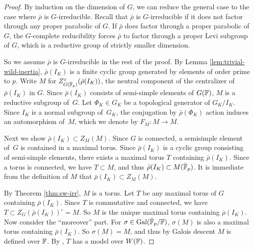 \documentclass[10pt,a4paper,twoside]{article}
\begin{document}
\begin{proof}
By induction on the dimension of $G$,
we can reduce the general case to the case where $\bar\rho$ is $G$-irreducible.
Recall that $\bar\rho$ is $G$-irreducible if it does not factor through any proper parabolic of $G$.
If $\bar\rho$ does factor through a proper parabolic of $G$, the $G$-complete reducibility forces
$\bar\rho$ to factor through a proper Levi subgroup of $G$, which is a reductive group
of strictly smaller dimension.

So we assume $\bar\rho$ is $G$-irreducible in the rest of the proof.
By Lemma \ref{lem:trivial-wild-inertia}, $\bar \rho(I_K)$ is a finite cyclic group
generated by elements of order prime to $p$.
Write $M$ for $Z^{\circ}_{G(\bar{\mathbb{F}}_p)}(\bar \rho(I_K))$,
the neutral component of the centralizer of $\bar \rho(I_K)$ in $G$.
Since $\bar\rho(I_K)$ consists of semi-simple elements of $G({\mathbb{F}})$,
$M$ is a reductive subgroup of~$G$.
Let $\Phi_K \in G_K$ be a topological generator of $G_K/I_K$.
Since $I_K$ is a normal subgroup of~$G_K$,
the conjugation by $\bar\rho(\Phi_K)$ action induces an automorphism of~$M$,
which we denote by $F_M: M \to M$.

Next we show $\bar\rho(I_K)\subset Z_M(M)$.
Since $G$ is connected, a semisimple element of~$G$ is contained in a maximal torus.
Since $\bar\rho(I_K)$ is a cyclic group consisting of semi-simple elements,
there exists a maximal torus $T$ containing $\bar\rho(I_K)$.
Since a torus is connected, we have $T\subset M$, and thus $\bar\rho(I_K)\subset M(\bar{\mathbb{F}}_p)$.
It is immediate from the definition of $M$ that $\bar\rho(I_K) \subset Z_M(M)$.


By Theorem \ref{thm:sw-irr}, $M$ is a torus.
Let $T$ be any maximal torus of $G$ containing $\bar\rho(I_K)$.
Since $T$ is commutative and connected, we have $T \subset Z_G(\bar\rho(I_K))^\circ = M$.
So $M$ is the unique maximal torus containing $\bar\rho(I_K)$.
Now consider the ``moreover'' part.
For $\sigma \in \operatorname{Gal}(\bar{\mathbb{F}}_p/{\mathbb{F}})$,
$\sigma(M)$ is also a maximal torus containing $\bar\rho(I_K)$.
So $\sigma(M) = M$, and thus by Galois descent $M$ is defined over ${\mathbb{F}}$.
By \cite[B.3.5]{Crd14}, $T$ has a model over $W({\mathbb{F}})$.
\end{proof}
\end{document}

